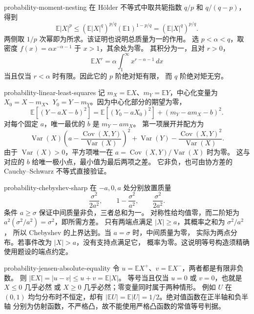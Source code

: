 \begin{solution}{probability-moment-nesting}
在 Hölder 不等式中取共轭指数 \(q/p\) 和 \(q/(q-p)\)，得到
\[
 \mathbb E|X|^p
 \le(\mathbb E|X|^q)^{p/q}
       (\mathbb E1)^{1-p/q}=(\mathbb E|X|^q)^{p/q}.
\]
两侧取 \(1/p\) 次幂即为所求。该证明也说明总质量为一的作用。
选 \(p<\alpha<q\)，取密度
\(f(x)=\alpha x^{-\alpha-1}\) 于 \(x>1\)，其余处为零。
其积分为一，且对 \(r>0\)，
\[
 \mathbb E X^r=\alpha\int_1^\infty x^{r-\alpha-1}\,dx
\]
当且仅当 \(r<\alpha\) 时有限。因此它的 \(p\) 阶绝对矩有限，
而 \(q\) 阶绝对矩无穷。
\end{solution}

\begin{solution}{probability-linear-least-squares}
记 \(m_X=\mathbb E X\)、\(m_Y=\mathbb E Y\)，中心化变量为
\(X_0=X-m_X\)、\(Y_0=Y-m_Y\)。因为中心化部分的期望为零，
\[
 \mathbb E[(Y-aX-b)^2]
 =\mathbb E[(Y_0-aX_0)^2]+(m_Y-am_X-b)^2.
\]
对每个固定 \(a\)，唯一最优的 \(b\) 是 \(m_Y-am_X\)。
第一项展开并配方为
\[
 \operatorname{Var}(X)
 \left(a-\frac{\operatorname{Cov}(X,Y)}{\operatorname{Var}(X)}\right)^2
 +\operatorname{Var}(Y)
 -\frac{\operatorname{Cov}(X,Y)^2}{\operatorname{Var}(X)}.
\]
由于 \(\operatorname{Var}(X)>0\)，平方项唯一在
\(a=\operatorname{Cov}(X,Y)/\operatorname{Var}(X)\) 时为零。
这与对应的 \(b\) 给唯一极小点，最小值为最后两项之差。
它非负，也可由协方差的 Cauchy--Schwarz 不等式直接验证。
\end{solution}

\begin{solution}{probability-chebyshev-sharp}
在 \(-a,0,a\) 处分别放置质量
\[
 \frac{\sigma^2}{2a^2},\qquad
 1-\frac{\sigma^2}{a^2},\qquad
 \frac{\sigma^2}{2a^2}.
\]
条件 \(a\ge\sigma\) 保证中间质量非负，三者总和为一。
对称性给均值零，而二阶矩为
\(a^2(\sigma^2/a^2)=\sigma^2\)，即所需方差。
只有两端点满足 \(|X|\ge a\)，其概率之和为 \(\sigma^2/a^2\)，
所以 Chebyshev 的上界达到。当 \(a=\sigma\) 时，中间质量为零，
实际为两点分布。若事件改为 \(|X|>a\)，没有支持点满足它，
概率为零。这说明等号构造须精确使用题设的端点约定。
\end{solution}

\begin{solution}{probability-jensen-absolute-equality}
令 \(u=\mathbb E X^+\)、\(v=\mathbb E X^-\)，两者都是有限非负数。
则 \(|\mathbb E X|=|u-v|\le u+v=\mathbb E|X|\)。
等号当且仅当 \(u=0\) 或 \(v=0\)，也就是 \(X\le0\) 几乎必然
或 \(X\ge0\) 几乎必然；零变量同时属于两种情形。
例如 \(U\) 在 \((0,1)\) 均匀分布时不恒定，却有
\(|\mathbb E U|=\mathbb E|U|=1/2\)。绝对值函数在正半轴和负半轴
分别为仿射函数，不严格凸，故不能使用严格凸函数的常值等号判据。
\end{solution}

